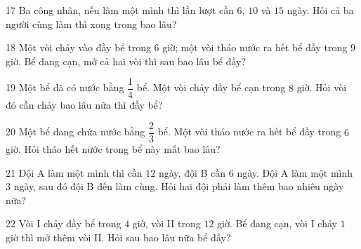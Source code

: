 \gap
\begin{probbox}{17}{\relax}
Ba công nhân, nếu làm một mình thì lần lượt cần $6$, $10$ và $15$ ngày. Hỏi cả ba người cùng làm thì xong trong bao lâu?
\end{probbox}
\gap
\begin{probbox}{18}{\relax}
Một vòi chảy vào đầy bể trong $6$ giờ; một vòi tháo nước ra hết bể đầy trong $9$ giờ. Bể đang cạn, mở cả hai vòi thì sau bao lâu bể đầy?
\end{probbox}
\gap
\begin{probbox}{19}{\relax}
Một bể đã có nước bằng $\dfrac14$ bể. Một vòi chảy đầy bể cạn trong $8$ giờ. Hỏi vòi đó cần chảy bao lâu nữa thì đầy bể?
\end{probbox}
\gap
\begin{probbox}{20}{\relax}
Một bể đang chứa nước bằng $\dfrac23$ bể. Một vòi tháo nước ra hết bể đầy trong $6$ giờ. Hỏi tháo hết nước trong bể này mất bao lâu?
\end{probbox}
\gap
\begin{probbox}{21}{\relax}
Đội A làm một mình thì cần $12$ ngày, đội B cần $6$ ngày. Đội A làm một mình $3$ ngày, sau đó đội B đến làm cùng. Hỏi hai đội phải làm thêm bao nhiêu ngày nữa?
\end{probbox}
\gap
\begin{probbox}{22}{\relax}
Vòi I chảy đầy bể trong $4$ giờ, vòi II trong $12$ giờ. Bể đang cạn, vòi I chảy $1$ giờ thì mở thêm vòi II. Hỏi sau bao lâu nữa bể đầy?
\end{probbox}
